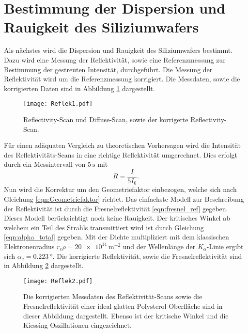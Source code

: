 \section{Bestimmung der Dispersion und Rauigkeit des Siliziumwafers}
\label{sec:dis_rau}
Als nächstes wird die Dispersion und Rauigkeit des Siliziumwafers bestimmt. Dazu wird eine Messung der Reflektivität, sowie eine Referenzmessung zur Bestimmung der gestreuten
Intensität, durchgeführt. Die Messung der Reflektivität wird um die Referenzmessung korrigiert. Die Messdaten, sowie die korrigierten Daten sind in Abbildung \ref{fig:Reflek1}
dargestellt.
\begin{figure}
    \centering
    \texttt{[image: Reflek1.pdf]}
    \caption{Reflectivity-Scan und Diffuse-Scan, sowie der korrigerte Reflectivity-Scan.}
    \label{fig:Reflek1}
\end{figure}

Für einen adäquaten Vergleich zu theoretischen Vorhersagen wird die Intensität des Reflektivitäts-Scans in eine richtige Reflektivität umgerechnet. Dies erfolgt durch ein 
Messintervall von $\qty{5}{\second}$ mit 
\begin{equation*}
    R = \frac{I}{5I_0}.
\end{equation*}
Nun wird die Korrektur um den Geometriefaktor einbezogen, welche sich nach Gleichung \ref{eqn:Geometriefaktor} richtet. Das einfachste Modell zur Beschreibung der 
Reflektivität ist durch die Fresnelreflektivität \ref{eqn:fresnel_ref} gegeben. Dieses Modell berücksichtigt noch keine Rauigkeit. Der kritisches Winkel ab welchem ein Teil des
Strahls transmittiert wird ist durch Gleichung \ref{eqn:alpha_total} gegeben. Mit der Dichte multipliziert mit dem klassischen Elektronenradius $r_e\rho = \qty{20e14}{\metre^{-2}}$ \cite{V44} und der Wellenlänge 
der $K_\alpha$-Linie ergibt sich $\alpha_\text{c} = \qty{0.223}{\degree}$. Die korrigierte Reflektivität, sowie die Fresnelreflektivität sind in Abbildung \ref{fig:Reflek2}
dargestellt.

\begin{figure}
    \centering
    \texttt{[image: Reflek2.pdf]}
    \caption{Die korrigierten Messdaten des Reflektivität-Scans sowie die Fresnelreflektivität einer 
    ideal glatten Polysterol Oberfläche sind in dieser Abbildung dargestellt. Ebenso ist der kritische Winkel und die Kiessing-Oszillationen eingezeichnet.}
    \label{fig:Reflek2}
\end{figure}

